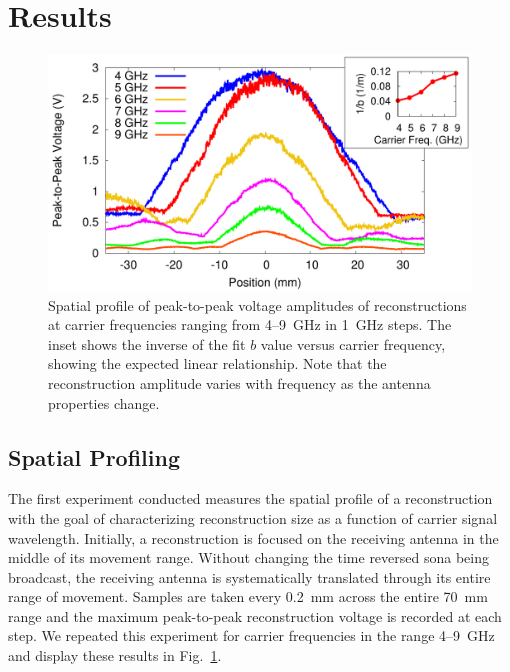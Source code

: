 \section{Results}


\begin{figure}[t!]
\includegraphics[width=\columnwidth]{figs/freq_profile.pdf}
\caption{Spatial profile of peak-to-peak voltage amplitudes of reconstructions
at carrier frequencies ranging from \numrange{4}{9}~GHz in 1~GHz
steps. The inset shows the inverse of the fit $b$ value versus carrier
frequency, showing the expected linear relationship. Note that the reconstruction amplitude varies with frequency as the antenna properties change.}
\vspace{\baselineskip}
\label{fig:freq_profile}
\end{figure}


\subsection{Spatial Profiling}
\label{sec:spatial}

The first experiment conducted measures the spatial profile of a reconstruction
with the goal of characterizing reconstruction size as a function of carrier
signal wavelength.
%
Initially, a reconstruction is focused on the receiving antenna in the middle of its
movement range.
%
Without changing the time reversed sona being broadcast, the receiving antenna
is systematically translated through its entire range of movement.
%
Samples are taken every 0.2~mm across the entire 70~mm range and the
maximum peak-to-peak reconstruction voltage is recorded at
each step.
%
We repeated this experiment for carrier frequencies in the range
\numrange{4}{9}~GHz and display these results in Fig.~\ref{fig:freq_profile}.



